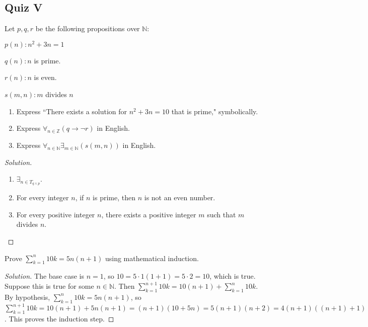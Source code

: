 \documentclass[../main.tex]{subfiles}
\begin{document}
\subsection{Quiz V}
%
\begin{problem}
Let $p,q,r$ be the following propositions over $\mathbb{N}$:
\begin{enumerate}
\begin{multicols}{4}
\item[] $p(n):	n^2+3n = 1$
\item[] $q(n):	n$ is prime.
\item[] $r(n):	n$ is even.
\item[] $s(m,n):	m$ divides $n$
\end{multicols}
\end{enumerate}
\begin{enumerate}
\item Express ``There exists a solution for $n^2+3n = 10$ that is prime," symbolically.
\item Express $\forall_{n\in \mathbb{Z}}(q\rightarrow \neg r)$ in English.
\item Express $\forall_{n\in \mathbb{N}}\exists_{m\in \mathbb{N}}(s(m,n))$ in English.
\end{enumerate}
\end{problem}
\begin{proof}[Solution]
\
\begin{enumerate}
\item $\exists_{n\in T_{q\land p}}$.
\item For every integer $n$, if $n$ is prime, then $n$ is not an even number.
\item For every positive integer $n$, there exists a positive integer $m$ such that $m$ divides $n$. 
\end{enumerate}
\end{proof}

\begin{problem}
Prove $\sum_{k=1}^{n} 10k = 5n(n+1)$ using mathematical induction. 
\end{problem}
\begin{proof}[Solution]
The base case is $n=1$, so $10 = 5\cdot 1(1+1) = 5\cdot 2 = 10$, which is true. Suppose this is true for some $n\in \mathbb{N}$. Then $\sum_{k=1}^{n+1} 10k = 10(n+1) + \sum_{k=1}^{n} 10k$. By hypothesis, $\sum_{k=1}^{n} 10k = 5n(n+1)$, so $\sum_{k=1}^{n+1}10k = 10(n+1)+5n(n+1) = (n+1)(10+5n) = 5(n+1)(n+2) = 4(n+1)((n+1)+1)$. This proves the induction step.
\end{proof}
\end{document}
